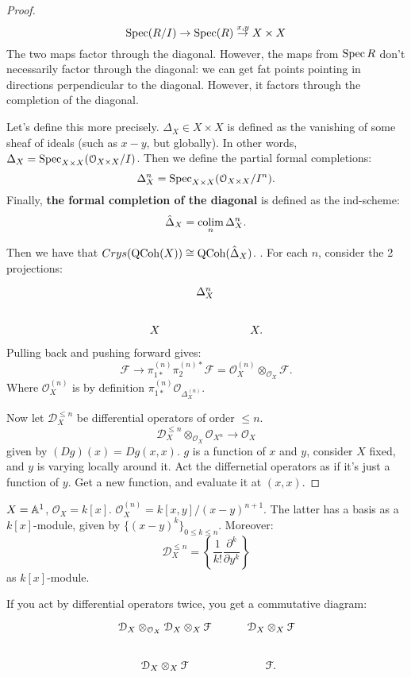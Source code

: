 \begin{proof}
\[	\operatorname{Spec} (R/I) \to \operatorname{Spec}(R) \overset{x,y}{\to} X \times X	\]
The two maps factor through the diagonal. However, the maps from $\operatorname{Spec} R$ don't necessarily factor through the diagonal:
we can get fat points pointing in directions perpendicular to the diagonal. However, it factors through the completion of
the diagonal.

Let's define this more precisely. $\Delta_X \in X \times X$ is defined as the vanishing of some sheaf of ideals (such
as $x-y$, but globally). In other words, $\Delta_X = \operatorname{Spec}_{X\times X}(\mathcal{O}_{X\times X}/I)$. Then we define
the partial formal completions:
\[	\Delta^n_X = \operatorname{Spec}_{X\times X} (\mathcal{O}_{X\times X}/I^n) .	\]
Finally, \textbf{the formal completion of the diagonal} is defined as the ind-scheme:
\[	\hat \Delta_X = \operatorname*{colim}_n \Delta^n_X.	\]

Then we have that $Crys(\mathrm{QCoh}(X)) \cong \mathrm{QCoh}(\hat \Delta_X)$. . For each $n$, consider the 2 projections:
\[
\begin{tikzcd}
\; & \Delta^n_X & \\
X & & X.
\end{tikzcd}
\]
Pulling back and pushing forward gives:
\[	\mathcal{F} \to \pi^{(n)}_{1*} \pi_2^{(n)*} \mathcal{F} = \mathcal{O}_X^{(n)} \otimes_{\mathcal{O}_X} \mathcal{F}.	\]
Where $\mathcal{O}_X^{(n)}$ is by definition $\pi_{1*}^{(n)}\mathcal{O}_{\Delta^{(n)}_X}$.

Now let $\mathcal{D}_X^{\leq n}$ be differential operators of order $\leq n$.
\[	\mathcal{D}_X^{\leq n} \otimes_{\mathcal{O}_X} \mathcal{O}_{X^n} \to \mathcal{O}_X	\]
given by $(Dg)(x) = Dg(x,x)$. $g$ is a function of $x$ and $y$, consider $X$ fixed, and $y$ is varying locally around it.
Act the differnetial operators as if it's just a function of $y$. Get a new function, and evaluate it at $(x,x)$.
\end{proof}

\begin{eg}
$X = \mathbb A^1$, $\mathcal{O}_X = k[x]$. $\mathcal{O}_X^{(n)} = k[x,y]/(x-y)^{n+1}$. The latter has a basis as
a $k[x]$-module, given by $\{(x-y)^k\}_{0\leq k \leq n}$. Moreover:
\[	\mathcal{D}_X^{\leq n} = \left\{ \frac{1}{k!} \frac{\partial^k}{\partial y^k} \right\}	\]
as $k[x]$-module.
\end{eg}

\begin{lem}
If you act by differential operators twice, you get a commutative diagram:
\[
\begin{tikzcd}
\mathcal{D}_X \otimes_{\mathcal{O}_X} \mathcal{D}_X \otimes_X \mathcal{F} & \mathcal{D}_X \otimes_X \mathcal{F} \\
\mathcal{D}_X \otimes_X \mathcal{F} & \mathcal{F}.
\end{tikzcd}
\]
\end{lem}

